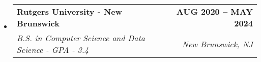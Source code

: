 \documentclass[letterpaper,11pt]{article}
\makeatletter
\newcommand{\resumeSubheading}[4]{
  \vspace{-2pt}\item
    \begin{tabular*}{1.0\textwidth}[t]{l@{\extracolsep{\fill}}r}
      \textbf{\large#1} & \textbf{\small #2} \\
      \textit{\large#3} & \textit{\small #4} \\   
    \end{tabular*}\vspace{-7pt}
}
\newcommand{\resumeSubHeadingListStart}{\begin{itemize}[leftmargin=0.0in, label={}]}
\newcommand{\resumeSubHeadingListEnd}{\end{itemize}}
\makeatother
\begin{document}
  \resumeSubHeadingListStart
    \resumeSubheading
      {Rutgers University - New Brunswick}{AUG 2020 -- MAY 2024}
      {B.S. in Computer Science and Data Science - {GPA} - {3.4}}{New Brunswick, NJ}
  \resumeSubHeadingListEnd
\vspace{-8pt}
\end{document}

